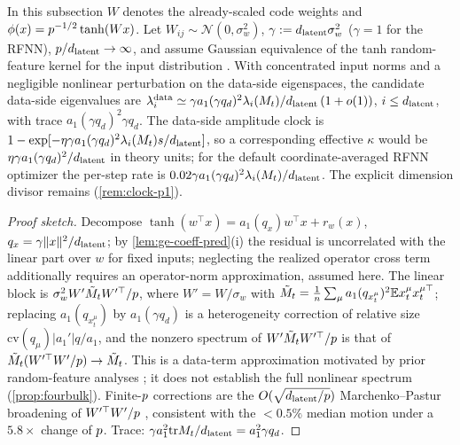 \begin{proposition}\label{prop:data-side-rates-pred}
In this subsection $W$ denotes the already-scaled code weights and $\phi(x)=p^{-1/2}\tanh(Wx)$. Let $W_{ij}\sim\mathcal N(0,\sigma_w^2)$, $\gamma:=d_{\mathrm{latent}}\sigma_w^2$ ($\gamma=1$ for the RFNN), $p/d_{\mathrm{latent}}\to\infty$, and assume Gaussian equivalence of the tanh random-feature kernel for the input distribution \citep{pennington2017nonlinear,benigni2021eigenvalue,hu2022universality,goldt2022gaussian}. With concentrated input norms and a negligible nonlinear perturbation on the data-side eigenspaces, the candidate data-side eigenvalues are $\lambda_i^{\rm data}\simeq\gamma a_1(\gamma q_d)^2\lambda_i(M_t)/d_{\mathrm{latent}}\,(1+o(1))$, $i\le d_{\mathrm{latent}}$, with trace $a_1(\gamma q_d)^2\gamma q_d$. The data-side amplitude clock is $1-\exp[-\eta\gamma a_1(\gamma q_d)^2\lambda_i(M_t)s/d_{\mathrm{latent}}]$, so a corresponding effective $\kappa$ would be $\eta\gamma a_1(\gamma q_d)^2/d_{\mathrm{latent}}$ in theory units; for the default coordinate-averaged RFNN optimizer the per-step rate is $0.02\gamma a_1(\gamma q_d)^2\lambda_i(M_t)/d_{\mathrm{latent}}$. The explicit dimension divisor remains (\cref{rem:clock-p1}).

\end{proposition}
\begin{proof}[Proof sketch]
Decompose $\tanh(w^\top x)=a_1(q_x)w^\top x+r_w(x)$, $q_x=\gamma\|x\|^2/d_{\mathrm{latent}}$; by \cref{lem:ge-coeff-pred}(i) the residual is uncorrelated with the linear part over $w$ for fixed inputs; neglecting the realized operator cross term additionally requires an operator-norm approximation, assumed here. The linear block is $\sigma_w^2W'\tilde M_tW'^\top/p$, where $W'=W/\sigma_w$ with $\tilde M_t=\frac1{n}\sum_\mu a_1(q_{x_t^\mu})^2\mathbb{E} x_t^\mu x_t^{\mu\top}$; replacing $a_1(q_{x_t^\mu})$ by $a_1(\gamma q_d)$ is a heterogeneity correction of relative size $\mathrm{cv}(q_\mu)|a_1'|q/a_1$, and the nonzero spectrum of $W'\tilde M_tW'^\top/p$ is that of $\tilde M_t(W'^\top W'/p)\to\tilde M_t$. This is a data-term approximation motivated by prior random-feature analyses \citep{bonnaire2025,george2025dsm}; it does not establish the full nonlinear spectrum (\cref{prop:fourbulk}). Finite-$p$ corrections are the $O(\sqrt{d_{\mathrm{latent}}/p})$ Marchenko--Pastur broadening of $W'^\top W'/p$ \citep{marchenko1967distribution}, consistent with the $<0.5\%$ median motion under a $5.8\times$ change of $p$. Trace: $\gamma a_1^2\mathrm{tr}M_t/d_{\mathrm{latent}}=a_1^2\gamma q_d$.
\end{proof}

